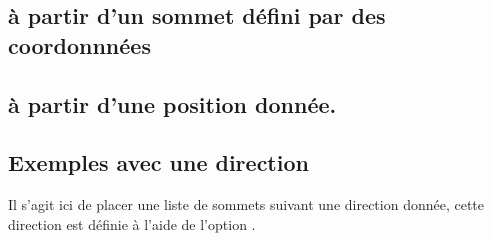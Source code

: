                                                                     
\subsection{ à partir d'un sommet défini par des coordonnnées}                 
  
                                                                   
\begin{center}                                                     
\begin{tkzexample}[latex=7cm, ,small]                              
\end{tkzexample}
\end{center}

\subsection{ à partir d'une position donnée.}

\begin{center}                                                     
\begin{tkzexample}[latex=7cm, ,small] 
\end{tkzexample}
\end{center}

\subsection{Exemples avec une direction } 
 Il s'agit ici de placer une liste de sommets suivant une direction donnée, cette direction est définie à l'aide de l'option .  


\begin{center}
\begin{tkzexample}[latex=7cm, ,small]  
\end{tkzexample}
\end{center} 
              

